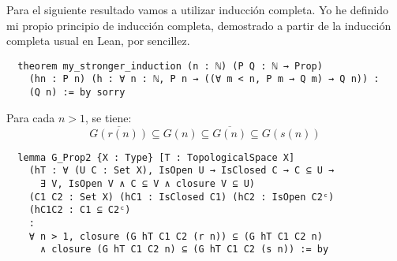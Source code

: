 Para el siguiente resultado vamos a utilizar inducción completa. Yo he definido mi propio principio de inducción completa, demostrado a partir de la inducción completa usual en Lean, por sencillez.

\begin{lstlisting}
  theorem my_stronger_induction (n : ℕ) (P Q : ℕ → Prop)
    (hn : P n) (h : ∀ n : ℕ, P n → ((∀ m < n, P m → Q m) → Q n)) :
    (Q n) := by sorry
\end{lstlisting}

\begin{lemma}
  Para cada $n > 1$, se tiene:
  $$
   \overline{G(r(n))} \subseteq G(n) \subseteq \overline{G(n)} \subseteq G(s(n))
  $$
\end{lemma}

\begin{lstlisting}
  lemma G_Prop2 {X : Type} [T : TopologicalSpace X]
    (hT : ∀ (U C : Set X), IsOpen U → IsClosed C → C ⊆ U →
      ∃ V, IsOpen V ∧ C ⊆ V ∧ closure V ⊆ U)
    (C1 C2 : Set X) (hC1 : IsClosed C1) (hC2 : IsOpen C2ᶜ)
    (hC1C2 : C1 ⊆ C2ᶜ)
    :
    ∀ n > 1, closure (G hT C1 C2 (r n)) ⊆ (G hT C1 C2 n)
      ∧ closure (G hT C1 C2 n) ⊆ (G hT C1 C2 (s n)) := by
\end{lstlisting}

